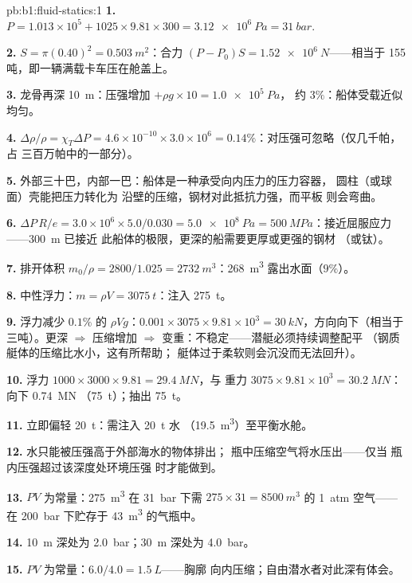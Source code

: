 \begin{solution}{pb:b1:fluid-statics:1}
\textbf{1.} $P = 1.013\times10^5 + 1025 \times 9.81 \times 300 = \qty{3.12e6}{Pa}
= \qty{31}{bar}$.

\textbf{2.} $S = \pi(0.40)^2 = \qty{0.503}{m^2}$：合力 $(P - P_0)S =
\qty{1.52e6}{N}$——相当于 155 吨，即一辆满载卡车压在舱盖上。

\textbf{3.} 龙骨再深 \qty{10}{m}：压强增加 $+\rho g \times 10 = \qty{1.0e5}{Pa}$，
约 $3\%$：船体受载近似均匀。

\textbf{4.} $\Delta\rho/\rho = \chi_T\Delta P = 4.6\times10^{-10} \times 3.0\times10^6
= 0.14\%$：对压强可忽略（仅几千帕，占
三百万帕中的一部分）。

\textbf{5.} 外部三十巴，内部一巴：船体是一种承受向内压力的压力容器，
圆柱（或球面）壳能把压力转化为
沿壁的压缩，钢材对此抵抗力强，而平板
则会弯曲。

\textbf{6.} $\Delta P\,R/e = 3.0\times10^6 \times 5.0/0.030 = \qty{5.0e8}{Pa}
= \qty{500}{MPa}$：接近屈服应力——\qty{300}{m} 已接近
此船体的极限，更深的船需要更厚或更强的钢材
（或钛）。

\textbf{7.} 排开体积 $m_0/\rho = 2800/1.025 = \qty{2732}{m^3}$：\qty{268}{m^3}
露出水面（$9\%$）。

\textbf{8.} 中性浮力：$m = \rho V = \qty{3075}{t}$：注入 \qty{275}{t}。

\textbf{9.} 浮力减少 $0.1\%$ 的 $\rho Vg$：$0.001 \times 3075 \times 9.81
\times10^3 = \qty{30}{kN}$，方向向下（相当于三吨）。更深 $\Rightarrow$ 压缩增加
$\Rightarrow$ 变重：不稳定——潜艇必须持续调整配平
（钢质艇体的压缩比水小，这有所帮助；
艇体过于柔软则会沉没而无法回升）。

\textbf{10.} 浮力 $1000 \times 3000 \times 9.81 = \qty{29.4}{MN}$，与
重力 $3075 \times 9.81 \times 10^3 = \qty{30.2}{MN}$：向下 \qty{0.74}{MN}
（\qty{75}{t}）；抽出 \qty{75}{t}。

\textbf{11.} 立即偏轻 \qty{20}{t}：需注入 \qty{20}{t} 水
（\qty{19.5}{m^3}）至平衡水舱。

\textbf{12.} 水只能被压强高于外部海水的物体排出；
瓶中压缩空气将水压出——仅当
瓶内压强超过该深度处环境压强
时才能做到。

\textbf{13.} $PV$ 为常量：\qty{275}{m^3} 在 \qty{31}{bar} 下需 $275 \times 31
= \qty{8500}{m^3}$ 的 \qty{1}{atm} 空气——在 \qty{200}{bar} 下贮存于
\qty{43}{m^3} 的气瓶中。

\textbf{14.} \qty{10}{m} 深处为 \qty{2.0}{bar}；\qty{30}{m} 深处为 \qty{4.0}{bar}。

\textbf{15.} $PV$ 为常量：$6.0/4.0 = \qty{1.5}{L}$——胸廓
向内压缩；自由潜水者对此深有体会。


\end{solution}
